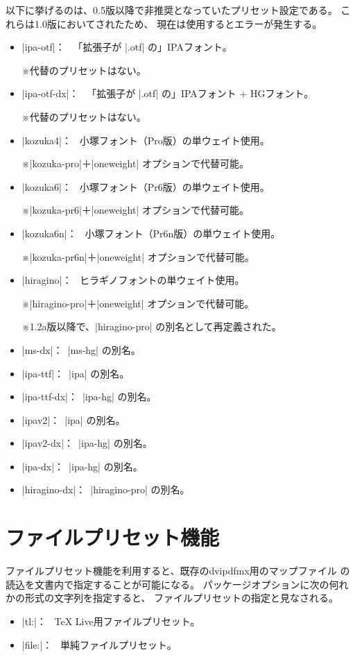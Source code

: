 \documentclass[uplatex,dvipdfmx,a4paper]{jsarticle}
\newcommand{\Note}{\par\noindent ※}
\newcommand{\Means}{：\ }
\newcommand{\Zk}{\mbox{}}
\begin{document}
以下に挙げるのは、0.5版以降で非推奨となっていたプリセット設定である。
これらは1.0版においてされたため、
現在は使用するとエラーが発生する。

\begin{itemize}
\item |ipa-otf|\Means
  「拡張子が |.otf| の」IPAフォント。
  \Note 代替のプリセットはない。
\item |ipa-otf-dx|\Means
  「拡張子が |.otf| の」IPAフォント + HGフォント。
  \Note 代替のプリセットはない。
\item |kozuka4|\Means
  小塚フォント（Pro版）の単ウェイト使用。
  \Note |kozuka-pro|＋|oneweight| オプションで代替可能。
\item |kozuka6|\Means
  小塚フォント（Pr6版）の単ウェイト使用。
  \Note |kozuka-pr6|＋|oneweight| オプションで代替可能。
\item |kozuka6n|\Means
  小塚フォント（Pr6n版）の単ウェイト使用。
  \Note |kozuka-pr6n|＋|oneweight| オプションで代替可能。
\item |hiragino|\Means
  ヒラギノフォントの単ウェイト使用。
  \Note |hiragino-pro|＋|oneweight| オプションで代替可能。
  \Note 1.2a版以降で、|hiragino-pro| の別名として再定義された。
\item |ms-dx|\Means |ms-hg| の別名。
\item |ipa-ttf|\Means |ipa| の別名。
\item |ipa-ttf-dx|\Means |ipa-hg| の別名。
\item |ipav2|\Means |ipa| の別名。
\item |ipav2-dx|\Means |ipa-hg| の別名。
\item |ipa-dx|\Means |ipa-hg| の別名。
\item |hiragino-dx|\Means |hiragino-pro| の別名。
\end{itemize}

\section{ファイルプリセット機能}
\label{sec:FilePreset}

ファイルプリセット機能を利用すると、既存のdvipdfmx用のマップファイル
の読込を文書内で指定することが可能になる。
パッケージオプションに次の何れかの形式の文字列を指定すると、
ファイルプリセットの指定と見なされる。

\begin{itemize}
\item |tl:|\Zk{}\Means
  {\TeX} Live用ファイルプリセット。
\item |file:|\Zk{}\Means
  単純ファイルプリセット。
\end{itemize}
\end{document}
